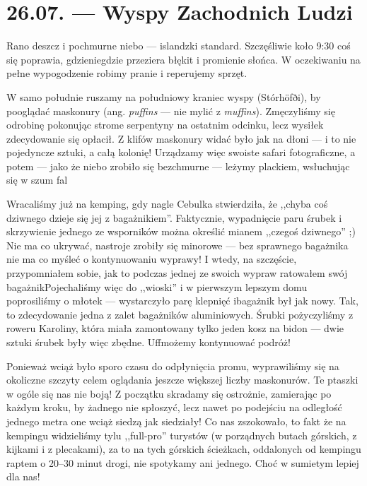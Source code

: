 \chapter*{26.07. --- Wyspy Zachodnich Ludzi}

Rano deszcz i pochmurne niebo --- islandzki standard. Szczęśliwie koło 9:30 coś się poprawia, gdzieniegdzie przeziera błękit i promienie słońca. W oczekiwaniu na pełne wypogodzenie robimy pranie i reperujemy sprzęt.


W samo południe ruszamy na południowy kraniec wyspy (Stórhöfði), by pooglądać maskonury (ang. \emph{puffins} --- nie mylić z \emph{muffins}). Zmęczyliśmy się odrobinę pokonując strome serpentyny na ostatnim odcinku, lecz wysiłek zdecydowanie się opłacił. Z klifów maskonury widać było jak na dłoni --- i to nie pojedyncze sztuki, a całą kolonię! Urządzamy więc swoiste safari fotograficzne, a potem --- jako że niebo zrobiło się bezchmurne --- leżymy plackiem, wsłuchując się w szum fal\textellipsis

Wracaliśmy już na kemping, gdy nagle Cebulka stwierdziła, że ,,chyba coś dziwnego dzieje się jej z bagażnikiem''. Faktycznie, wypadnięcie paru śrubek i skrzywienie jednego ze wsporników można określić mianem ,,czegoś dziwnego'' ;) Nie ma co ukrywać, nastroje zrobiły się minorowe --- bez sprawnego bagażnika nie ma co myśleć o kontynuowaniu wyprawy! I wtedy, na szczęście, przypomniałem sobie, jak to podczas jednej ze swoich wypraw ratowałem swój bagażnik\textellipsis Pojechaliśmy więc do ,,wioski'' i  w pierwszym lepszym domu poprosiliśmy o młotek --- wystarczyło parę klepnięć i\textellipsis bagażnik był jak nowy. Tak, to zdecydowanie jedna z zalet bagażników aluminiowych. Śrubki pożyczyliśmy z roweru Karoliny, która miała zamontowany tylko jeden kosz na bidon --- dwie sztuki śrubek były więc zbędne. Uff\textellipsis możemy kontynuować podróż!

Ponieważ wciąż było sporo czasu do odpłynięcia promu, wyprawiliśmy się na okoliczne szczyty celem oglądania jeszcze większej liczby maskonurów. Te ptaszki w ogóle się nas nie boją! Z początku skradamy się ostrożnie, zamierając po każdym kroku, by żadnego nie spłoszyć, lecz nawet po podejściu na odległość jednego metra one wciąż siedzą jak siedziały! Co nas zszokowało, to fakt że na kempingu widzieliśmy tylu ,,full-pro'' turystów (w porządnych butach górskich, z kijkami i z plecakami), za to na tych górskich ścieżkach, oddalonych od kempingu raptem o 20--30 minut drogi, nie spotykamy ani jednego. Choć w sumie\textellipsis tym lepiej dla nas!

